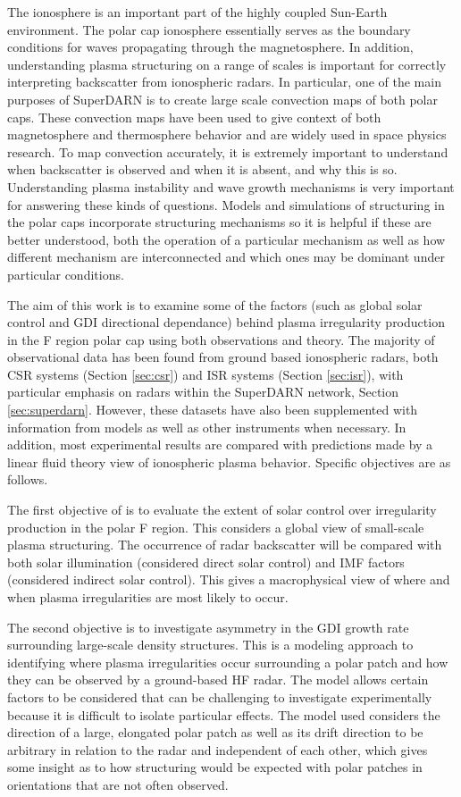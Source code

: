 The ionosphere is an important part of the highly coupled Sun-Earth environment.  The polar cap ionosphere essentially serves as the boundary conditions for waves propagating through the magnetosphere.  In addition, understanding plasma structuring on a range of scales is important for correctly interpreting backscatter from ionospheric radars.  In particular, one of the main purposes of SuperDARN is to create large scale convection maps of both polar caps.  These convection maps have been used to give context of both magnetosphere and thermosphere behavior and are widely used in space physics research.  To map convection accurately, it is extremely important to understand when backscatter is observed and when it is absent, and why this is so.  Understanding plasma instability and wave growth mechanisms is very important for answering these kinds of questions.  Models and simulations of structuring in the polar caps incorporate structuring mechanisms so it is helpful if these are better understood, both the operation of a particular mechanism as well as how different mechanism are interconnected and which ones may be dominant under particular conditions.

The aim of this work is to examine some of the factors (such as global solar control and GDI directional dependance) behind plasma irregularity production in the F region polar cap using both observations and theory.  The majority of observational data has been found from ground based ionospheric radars, both CSR systems (Section \ref{sec:csr}) and ISR systems (Section \ref{sec:isr}), with particular emphasis on radars within the SuperDARN network, Section \ref{sec:superdarn}.  However, these datasets have also been supplemented with information from models as well as other instruments when necessary.  In addition, most experimental results are compared with predictions made by a linear fluid theory view of ionospheric plasma behavior.  Specific objectives are as follows.

The first objective of is to evaluate the extent of solar control over irregularity production in the polar F region.  This considers a global view of small-scale plasma structuring.  The occurrence of radar backscatter will be compared with both solar illumination (considered direct solar control) and IMF factors (considered indirect solar control).  This gives a macrophysical view of where and when plasma irregularities are most likely to occur.

The second objective is to investigate asymmetry in the GDI growth rate surrounding large-scale density structures.  This is a modeling approach to identifying where plasma irregularities occur surrounding a polar patch and how they can be observed by a ground-based HF radar.  The model allows certain factors to be considered that can be challenging to investigate experimentally because it is difficult to isolate particular effects.  The model used considers the direction of a large, elongated polar patch as well as its drift direction to be arbitrary in relation to the radar and independent of each other, which gives some insight as to how structuring would be expected with polar patches in orientations that are not often observed.

